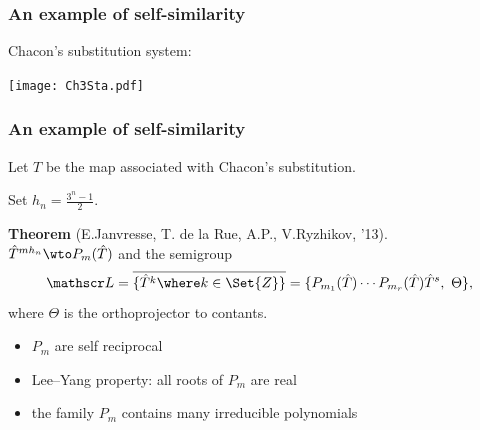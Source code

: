 %  
%  


\begin{frame}
  \frametitle{An example of self-similarity}
  
  Chacon's substitution system:

  \begin{flushright}
  \texttt{[image: Ch3Sta.pdf]}
  \end{flushright}

  
\end{frame}


\begin{frame}
  \frametitle{An example of self-similarity}
  
  Let $T$ be the map associated with Chacon's substitution.
  
  Set $h_n = \frac{3^n-1}2$. 

  \bigskip
  {\bf Theorem} (E.Janvresse, T. de la Rue, A.P., V.Ryzhikov, '13). \\ 
  $\Hat T^{mh_n} \wto P_m(\T)$ and the semigroup 
  $$
    \L = \overline{\{\T^k \where k \in \Set{Z}\}} = \{P_{m_1}(\T)\cdots P_{m_r}(\T)\T^s,\ \Theta\},
  $$
  where $\Theta$ is the orthoprojector to contants. 
  
  \bigskip
  \begin{itemize}
   \item $P_m$ are self reciprocal
   \item Lee--Yang property: all roots of $P_m$ are real
   \item the family $P_m$ contains many irreducible polynomials
  \end{itemize}

\end{frame}


